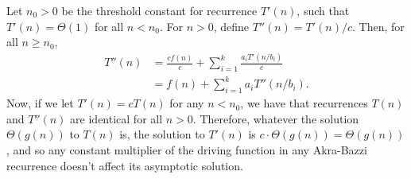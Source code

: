 \starred
Let $n_0>0$ be the threshold constant for recurrence $T'(n)$, such that $T'(n)=\Theta(1)$ for all $n<n_0$.
For $n>0$, define $T''(n)=T'(n)/c$.
Then, for all $n\ge n_0$,
\begin{align*}
    T''(n) &= \frac{cf(n)}{c}+\sum_{i=1}^k\frac{a_iT'(n/b_i)}{c} \\
    &= f(n)+\sum_{i=1}^ka_iT''(n/b_i).
\end{align*}
Now, if we let $T'(n)=cT(n)$ for any $n<n_0$, we have that recurrences $T(n)$ and $T''(n)$ are identical for all $n>0$.
Therefore, whatever the solution $\Theta(g(n))$ to $T(n)$ is, the solution to $T'(n)$ is $c\cdot\Theta(g(n))=\Theta(g(n))$, and so any constant multiplier of the driving function in any Akra-Bazzi recurrence doesn't affect its asymptotic solution.
